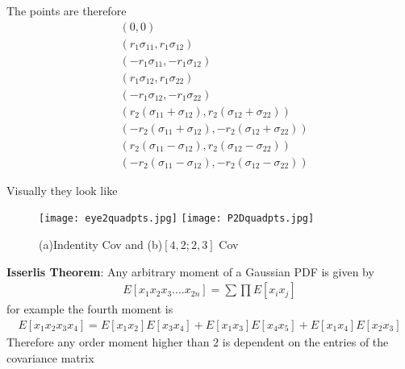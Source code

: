 \documentclass[landscape]{slides}
\begin{document}
\begin{slide}
 The points are therefore
  \begin{align*}
 &(0,0)\\
 &(r_1\sigma_{11},r_1\sigma_{12})\\
 &(-r_1\sigma_{11},-r_1\sigma_{12})\\
 &(r_1\sigma_{12},r_1\sigma_{22})\\
 &(-r_1\sigma_{12},-r_1\sigma_{22})\\
 &(r_2(\sigma_{11}+\sigma_{12}),r_2(\sigma_{12}+\sigma_{22}))\\
 &(-r_2(\sigma_{11}+\sigma_{12}),-r_2(\sigma_{12}+\sigma_{22}))\\
 &(r_2(\sigma_{11}-\sigma_{12}),r_2(\sigma_{12}-\sigma_{22}))\\
 &(-r_2(\sigma_{11}-\sigma_{12}),-r_2(\sigma_{12}-\sigma_{22}))
 \end{align*}
    	\end{slide}
\begin{slide}
 Visually they look like \newline\newline
\begin{figure}
	\texttt{[image: eye2quadpts.jpg]}
	\texttt{[image: P2Dquadpts.jpg]}
	\caption{(a)Indentity Cov and (b)$[4,2;2,3]$ Cov}
	\label{fig:eye2quadpts}
\end{figure}
    	\end{slide}
\begin{slide}
{\bf Isserlis Theorem}:\newline\newline
 Any arbitrary moment of a Gaussian PDF is given by 
 \begin{align*}
 E[x_1x_2x_3....x_{2n}]=\sum\prod{E[x_ix_j]}
 \end{align*} 
 for example the fourth moment is
 \begin{align*}
 E[x_1x_2x_3x_4]=E[x_1x_2]E[x_3x_4]+E[x_1x_3]E[x_4x_5]+E[x_1x_4]E[x_2x_3]
 \end{align*}
 Therefore any order moment higher than 2 is dependent on the entries of the covariance matrix
    	\end{slide}
\end{document}
